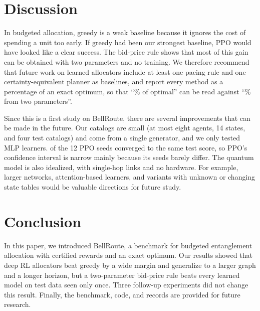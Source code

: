 \documentclass[10pt]{article}
\begin{document}
\section{Discussion}\label{sec:discussion}

In budgeted allocation, greedy is a weak baseline because it ignores the cost of spending a unit too early. If greedy had been our strongest baseline, PPO would have looked like a clear success. The bid-price rule shows that most of this gain can be obtained with two parameters and no training. We therefore recommend that future work on learned allocators include at least one pacing rule and one certainty-equivalent planner as baselines, and report every method as a percentage of an exact optimum, so that ``\cfFracPpo\% of optimal'' can be read against ``\cfFracBp\% from two parameters''.

Since this is a first study on BellRoute, there are several improvements that can be made in the future. Our catalogs are small (at most eight agents, 14 states, and four test catalogs) and come from a single generator, and we only tested MLP learners. \cfPpoSame{} of the 12 PPO seeds converged to the same test score, so PPO's confidence interval is narrow mainly because its seeds barely differ. The quantum model is also idealized, with single-hop links and no hardware. For example, larger networks, attention-based learners, and variants with unknown or changing state tables would be valuable directions for future study.

\section{Conclusion}\label{sec:conclusion}

In this paper, we introduced BellRoute, a benchmark for budgeted entanglement allocation with certified rewards and an exact optimum. Our results showed that deep RL allocators beat greedy by a wide margin and generalize to a larger graph and a longer horizon, but a two-parameter bid-price rule beats every learned model on test data seen only once. Three follow-up experiments did not change this result. Finally, the benchmark, code, and records are provided for future research.
\end{document}
